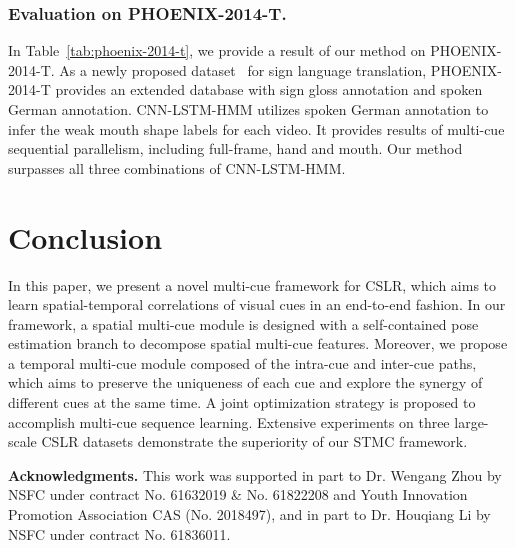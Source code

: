 \documentclass[letterpaper]{article} \usepackage{aaai20}  \usepackage{times}  \usepackage{helvet} \usepackage{courier}  \usepackage[hyphens]{url}  \usepackage{graphicx} \urlstyle{rm} \def\UrlFont{\rm}  \usepackage{graphicx}  \frenchspacing  \setlength{\pdfpagewidth}{8.5in}  \setlength{\pdfpageheight}{11in}
\begin{document}
\subsubsection{Evaluation on PHOENIX-2014-T.} In Table~\ref{tab:phoenix-2014-t}, we provide a result of our method on PHOENIX-2014-T. As a newly proposed dataset~\cite{phoenix2014t} for sign language translation, PHOENIX-2014-T provides an extended database with sign gloss annotation and spoken German annotation. CNN-LSTM-HMM utilizes spoken German annotation to infer the weak mouth shape labels for each video. It provides results of multi-cue sequential parallelism, including full-frame, hand and mouth. Our method surpasses all three combinations of CNN-LSTM-HMM.

\section{Conclusion}
In this paper, we present a novel multi-cue framework for CSLR, which aims to learn spatial-temporal correlations of visual cues in an end-to-end fashion. In our framework, a spatial multi-cue module is designed with a self-contained pose estimation branch to decompose spatial multi-cue features. Moreover, we propose a temporal multi-cue module composed of the intra-cue and inter-cue paths, which aims to preserve the uniqueness of each cue and explore the synergy of different cues at the same time. A joint optimization strategy is proposed to accomplish multi-cue sequence learning. Extensive experiments on three large-scale CSLR datasets demonstrate the superiority of our STMC framework.

{\bf Acknowledgments.} This work was supported in part to Dr. Wengang Zhou by NSFC under contract No. 61632019 \& No. 61822208 and Youth Innovation Promotion Association CAS (No. 2018497), and in part to Dr. Houqiang Li by NSFC under contract No. 61836011. 

{
\begin{spacing}{0.94}

\footnotesize



    
\end{spacing}
}
\end{document}
